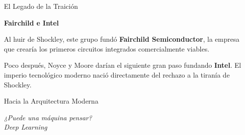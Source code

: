 \documentclass[10pt, aspectratio=169]{beamer}
\begin{document}
\begin{frame}{El Legado de la Traición}
    \vspace{0.8cm}
    \begin{center}
        \huge \textbf{Fairchild e Intel}
    \end{center}
    
    \vspace{0.8cm}
    \normalsize
    Al huir de Shockley, este grupo fundó \textbf{Fairchild Semiconductor}, la empresa que crearía los primeros circuitos integrados comercialmente viables. 
    
    \vspace{0.4cm}
    Poco después, Noyce y Moore darían el siguiente gran paso fundando \textbf{Intel}. El imperio tecnológico moderno nació directamente del rechazo a la tiranía de Shockley.
\end{frame}
\begin{frame}{Hacia la Arquitectura Moderna}
    \vspace{0.8cm}
    \begin{center}
        \huge \textit{¿Puede una máquina pensar?
	\\ Deep Learning}
    \end{center}
    
    \vspace{0.8cm}
    \normalsize
    
    \vspace{0.6cm}
\end{frame}
\end{document}
